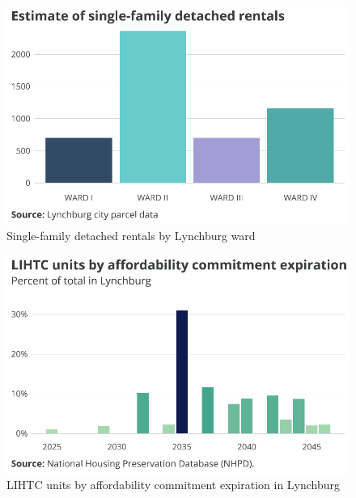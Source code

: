 \documentclass[
  letterpaper,
  DIV=11,
  numbers=noendperiod]{scrreprt}
\begin{document}
\begin{figure}[H]

{\centering \includegraphics{./part-3-3_files/figure-pdf/fig-sfr-ward-1.pdf}

}

\caption{\label{fig-sfr-ward}Single-family detached rentals by Lynchburg
ward}

\end{figure}

\begin{figure}[H]

{\centering \includegraphics{./part-3-3_files/figure-pdf/fig-lihtc-exp-1.pdf}

}

\caption{\label{fig-lihtc-exp}LIHTC units by affordability commitment
expiration in Lynchburg}

\end{figure}
\end{document}
